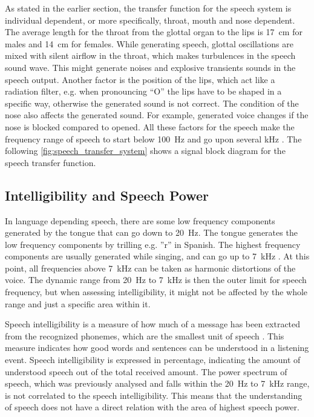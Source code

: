 As stated in the earlier section, the transfer function for the speech system is individual dependent, or more specifically, throat, mouth and nose dependent. The average length for the throat from the glottal organ to the lips is \SI{17}{\centi\meter} for males and \SI{14}{\centi\meter} for females. While generating speech, glottal oscillations are mixed with silent airflow in the throat, which makes turbulences in the speech sound wave. This might generate noises and explosive transients sounds in the speech output. Another factor is the position of the lips, which act like a radiation filter, e.g. when pronouncing \enquote{O} the lips have to be shaped in a specific way, otherwise the generated sound is not correct. The condition of the nose also affects the generated sound. For example, generated voice changes if the nose is blocked compared to opened. All these factors for the speech make the frequency range of speech to start below \SI{100}{\hertz} and go upon several \si{\kilo\hertz} \citep{pulkki2015}. The following \autoref{fig:speech_transfer_system} shows a signal block diagram for the speech transfer function.


\subsection{Intelligibility and Speech Power}
\label{sec:intel}

In language depending speech, there are some low frequency components generated by the tongue that can go down to \SI{20}{\hertz}. The tongue generates the low frequency components by trilling e.g. ''r'' in Spanish. The highest frequency components are usually generated while singing, and can go up to \SI{7}{\kilo\hertz} \citep{pulkki2015}. At this point, all frequencies above \SI{7}{\kilo\hertz} can be taken as harmonic distortions of the voice. The dynamic range from \SI{20}{\hertz} to \SI{7}{\kilo\hertz} is then the outer limit for speech frequency, but when assessing intelligibility, it might not be affected by the whole range and just a specific area within it.

Speech intelligibility is a measure of how much of a message has been extracted from the recognized phonemes, which are the smallest unit of speech \citep{arl_us_army}. This measure indicates how good words and sentences can be understood in a listening event. Speech intelligibility  is expressed in percentage, indicating the amount of understood speech out of the total received amount. The power spectrum of speech, which was previously analysed and falls within the \SI{20}{\hertz} to \SI{7}{\kilo\hertz} range, is not correlated to the speech intelligibility. This means that the understanding of speech does not have a direct relation with the area of highest speech power. 

